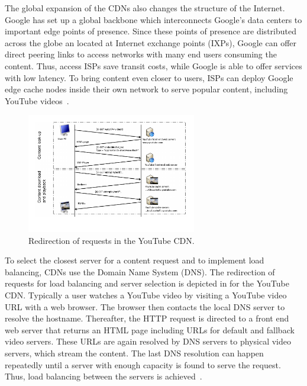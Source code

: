 The global expansion of the CDNs also changes the structure of the Internet.
Google has set up a global backbone which interconnects Google's data centers to important edge points of presence.
Since these points of presence are distributed across the globe an located at Internet exchange points (IXPs), Google can offer direct peering links to access networks with many end users consuming the content.
Thus, access ISPs save transit costs, while Google is able to offer services with low latency.
To bring content even closer to users, ISPs can deploy Google edge cache nodes inside their own network to serve popular content, including YouTube videos~\cite{gcc}.

\begin{figure}[bt]
\centering
	\includegraphics[width=0.66\textwidth]{aslevel/figs/cacheServerSelection}
	\vspace{-0.2cm}
 	\caption{Redirection of requests in the YouTube CDN.}
 	\label{fig:aslevel:serverselection}
\end{figure}

To select the closest server for a content request and to implement load balancing, CDNs use the Domain Name System (DNS).
The redirection of requests for load balancing and server selection is depicted in  for the YouTube CDN.
Typically a user watches a YouTube video by visiting a YouTube video URL with a web browser.
The browser then contacts the local DNS server to resolve the hostname.
Thereafter, the HTTP request is directed to a front end web server that returns an HTML page including URLs for default and fallback video servers.
These URLs are again resolved by DNS servers to physical video servers, which stream the content.
The last DNS resolution can happen repeatedly until a server with enough capacity is found to serve the request.
Thus, load balancing between the servers is achieved~\cite{adhikari2012vivisecting}.

